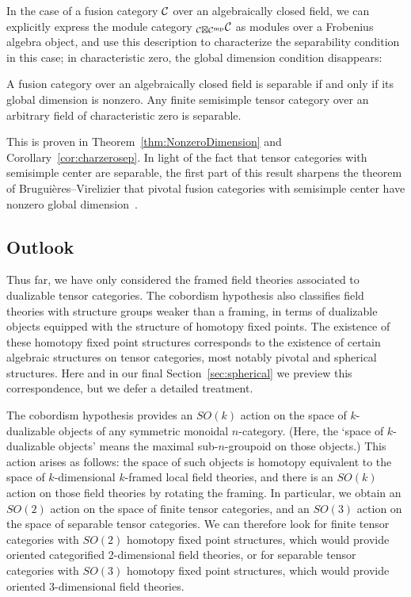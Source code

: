 \documentclass{amsart}
\begin{document}
In the case of a fusion category $\mathcal C$ over an algebraically closed field, we can explicitly express the module category ${}_{\mathcal C \boxtimes \mathcal C^{\mathrm{mp}}} \mathcal C$ as modules over a Frobenius algebra object, and use this description to characterize the separability condition in this case; in characteristic zero, the global dimension condition disappears:
\begin{maintheorem} \label{thm13}
A fusion category over an algebraically closed field is separable if and only if its global dimension is nonzero.  Any finite semisimple tensor category over an arbitrary field of characteristic zero is separable.
\end{maintheorem}
\nid This is proven in Theorem~\ref{thm:NonzeroDimension} and Corollary~\ref{cor:charzerosep}.  In light of the fact that tensor categories with semisimple center are separable, the first part of this result sharpens the theorem of Brugui\`eres--Virelizier that pivotal fusion categories with semisimple center have nonzero global dimension~\cite{MR3079759}.


\subsection{Outlook}

Thus far, we have only considered the framed field theories associated to dualizable tensor categories.  The cobordism hypothesis also classifies field theories with structure groups weaker than a framing, in terms of dualizable objects equipped with the structure of homotopy fixed points.  The existence of these homotopy fixed point structures corresponds to the existence of certain algebraic structures on tensor categories, most notably pivotal and spherical structures.  Here and in our final Section~\ref{sec:spherical} we preview this correspondence, but we defer a detailed treatment.

The cobordism hypothesis provides an $SO(k)$ action on the space of $k$-dualizable objects of any symmetric monoidal $n$-category.  (Here, the `space of $k$-dualizable objects' means the maximal sub-$n$-groupoid on those objects.)  This action arises as follows: the space of such objects is homotopy equivalent to the space of $k$-dimensional $k$-framed local field theories, and there is an $SO(k)$ action on those field theories by rotating the framing.  In particular, we obtain an $SO(2)$ action on the space of finite tensor categories, and an $SO(3)$ action on the space of separable tensor categories.  We can therefore look for finite tensor categories with $SO(2)$ homotopy fixed point structures, which would provide oriented categorified 2-dimensional field theories, or for separable tensor categories with $SO(3)$ homotopy fixed point structures, which would provide oriented 3-dimensional field theories.
\end{document}
